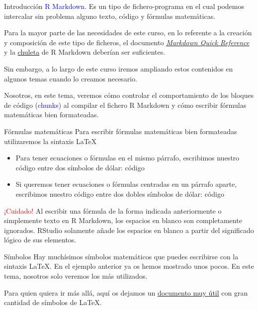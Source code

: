 \documentclass[
  ignorenonframetext,
  aspectratio=169]{beamer}
\providecommand{\tightlist}{%
  \setlength{\itemsep}{0pt}\setlength{\parskip}{0pt}}
\newcommand\blue[1]{\textcolor{blue}{#1}}
\newcommand\red[1]{\textcolor{red}{#1}}
\begin{document}
\begin{frame}{Introducción}
\protect\hypertarget{introducciuxf3n}{}
\blue{R Markdown.} Es un tipo de fichero-programa en el cual podemos
intercalar sin problema alguno texto, código y fórmulas matemáticas.

Para la mayor parte de las necesidades de este curso, en lo referente a
la creación y composición de este tipo de ficheros, el documento
\emph{\href{https://en.support.wordpress.com/markdown-quick-reference/}{Markdown
Quick Reference} } y la
\href{http://shiny.rstudio.com/images/rm-cheatsheet.pdf.zip.}{chuleta}
de R Markdown deberían ser suficientes.

Sin embargo, a lo largo de este curso iremos ampliando estos contenidos
en algunos temas cuando lo creamos necesario.

Nosotros, en este tema, veremos cómo controlar el comportamiento de los
bloques de código (\blue{chunks}) al compilar el fichero R Markdown y
cómo escribir fórmulas matemáticas bien formateadas.
\end{frame}

\begin{frame}{Fórmulas matemáticas}
\protect\hypertarget{fuxf3rmulas-matemuxe1ticas}{}
Para escribir fórmulas matemáticas bien formateadas utilizaremos la
sintaxis \LaTeX

\begin{itemize}
\tightlist
\item
  Para tener ecuaciones o fórmulas en el mismo párrafo, escribimos
  nuestro código entre dos símbolos de dólar: código
\item
  Si queremos tener ecuaciones o fórmulas centradas en un párrafo
  aparte, escribimos nuestro código entre dos dobles símbolos de dólar:
  código
\end{itemize}

\red{¡Cuidado!} Al escribir una fórmula de la forma indicada
anteriormente o simplemente texto en R Markdown, los espacios en blanco
son completamente ignorados. RStudio solamente añade los espacios en
blanco a partir del significado lógico de sus elementos.
\end{frame}

\begin{frame}{Símbolos}
\protect\hypertarget{suxedmbolos}{}
Hay muchísimos símbolos matemáticos que puedes escribirse con la
sintaxis \LaTeX. En el ejemplo anterior ya os hemos mostrado unos pocos.
En este tema, nosotros solo veremos los más utilizados.

Para quien quiera ir más allá, aquí os dejamos un
\href{http://www.ptep-online.com/ctan/symbols.pdf}{documento muy útil}
con gran cantidad de símbolos de \LaTeX.
\end{frame}
\end{document}
